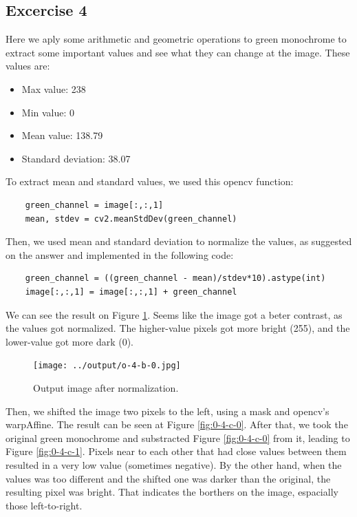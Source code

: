 \documentclass[]{IEEEtran}
\begin{document}
\subsection{Excercise 4}
  Here we aply some arithmetic and geometric operations to green monochrome to extract some important values and see what they can change at the image.
  These values are:
  \begin{itemize}
    \item{Max value: 238}
    \item{Min value: 0}
    \item{Mean value: 138.79}
    \item{Standard deviation: 38.07}
  \end{itemize}


  To extract mean and standard values, we used this opencv function:
  \begin{lstlisting}     
    green_channel = image[:,:,1]
    mean, stdev = cv2.meanStdDev(green_channel)
  \end{lstlisting}  

  Then, we used mean and standard deviation to normalize the values, as suggested on the answer and implemented in the following code:
  \begin{lstlisting}     
    green_channel = ((green_channel - mean)/stdev*10).astype(int)
    image[:,:,1] = image[:,:,1] + green_channel    
  \end{lstlisting}  
  We can see the result on Figure \ref{fig:o-4-b-0}. Seems like the image got a beter contrast, as the values got normalized. The higher-value pixels got more bright (255), and the lower-value got more dark (0).
  \begin{figure}[!h]
    \centering
    \texttt{[image: ../output/o-4-b-0.jpg]}
    \caption{Output image after normalization.}
    \label{fig:o-4-b-0}
  \end{figure}

  Then, we shifted the image two pixels to the left, using a mask and opencv's warpAffine. The result can be seen at Figure \ref{fig:0-4-c-0}. After that, we took the original green monochrome and substracted Figure \ref{fig:0-4-c-0} from it, leading to Figure \ref{fig:0-4-c-1}. Pixels near to each other that had close values between them resulted in a very low value (sometimes negative). By the other hand, when the values was too different and the shifted one was darker than the original, the resulting pixel was bright. That indicates the borthers on the image, espacially those left-to-right. 
\end{document}
